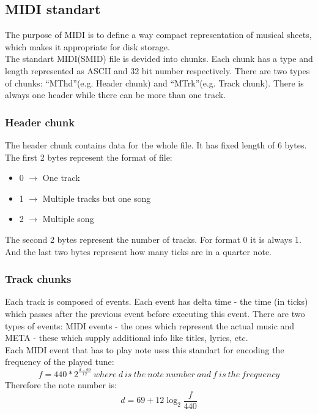 \documentclass[]{article}
\begin{document}
        \subsection { MIDI standart }
            The purpose of MIDI is to define a way compact representation of musical sheets, which makes it appropriate for disk storage.\\
            The standart MIDI(SMID) file is devided into chunks. Each chunk has a type and length represented as ASCII and 32 bit number respectively. There are two types of chunks: ``MThd''(e.g. Header chunk) and ``MTrk''(e.g. Track chunk). There is always one header while there can be more than one track.
            \subsubsection{Header chunk}
                The header chunk contains data for the whole file. It has fixed length of 6 bytes. The first 2 bytes represent the format of file:
                \begin{itemize}
                    \item 0 $\to$ One track
                    \item 1 $\to$ Multiple tracks but one song
                    \item 2 $\to$ Multiple song
                \end{itemize}
                The second 2 bytes represent the number of tracks. For format 0 it is always 1. And the last two bytes represent how many ticks are in a quarter note.
            \subsubsection{Track chunks}
                Each track is composed of events. Each event has delta time - the time (in ticks) which passes after the previous event before executing this event. There are two types of events: MIDI events - the ones which represent the actual music and META - these which supply additional info like titles, lyrics, etc. \\
                Each MIDI event that has to play note uses this standart for encoding the frequency of the played tune:
                $$f = 440 * 2^\frac{d - 69}{12}\ where\ d\ is\ the\ note\ number\ and\ f\ is\ the\ frequency$$
                Therefore the note number is:
                $$d = 69 + 12\log_2 \frac{f}{440}$$
\end{document}
